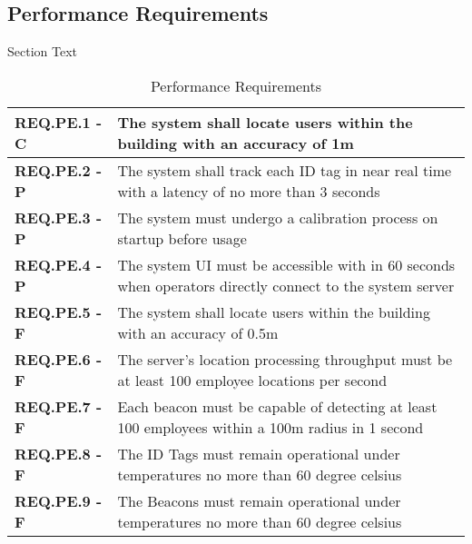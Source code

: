 \documentclass[11pt]{article}
\begin{document}
\subsection{Performance Requirements}
Section Text
\bgroup
\def\arraystretch{1.5}
\begin{table}[H]
\centering
\begin{tabular}{ | m{3.5cm} | m{12.5cm} | } 
 \hline
 \textbf{ REQ.PE.1 - C } & The system shall locate users within the building with an accuracy of 1m \\ 
\hline
 \textbf{ REQ.PE.2 - P} & The system shall track each ID tag in near real time with a latency of no more than 3 seconds \\ 
\hline
 \textbf{ REQ.PE.3 - P } & The system must undergo a calibration process on startup before usage \\ 
\hline
 \textbf{ REQ.PE.4 - P} & The system UI must be accessible with in 60 seconds when operators directly connect to the system server \\
\hline
 \textbf{ REQ.PE.5 - F} & The system shall locate users within the building with an accuracy of 0.5m \\
\hline
 \textbf{ REQ.PE.6 - F } & The server's location processing throughput must be at least 100 employee locations per second \\
\hline
 \textbf{ REQ.PE.7 - F } & Each beacon must be capable of detecting at least 100 employees within a 100m radius in 1 second \\
\hline
 \textbf{ REQ.PE.8 - F } & The ID Tags must remain operational under temperatures no more than 60 degree celsius \\
\hline
 \textbf{ REQ.PE.9 - F } & The Beacons must remain operational under temperatures no more than 60 degree celsius \\
\hline
\end{tabular}
\caption{Performance Requirements}
\end{table}	


	
\end{document}
